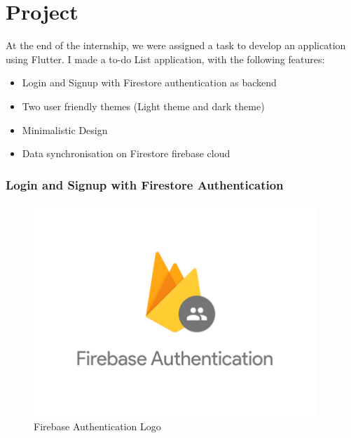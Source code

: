 \chapter{Project}
At the end of the internship, we were assigned a task to develop an application using Flutter. I made a to-do List application, with the following features:\\
\begin{itemize}
\item Login and Signup with Firestore authentication as backend
\item Two user friendly themes (Light theme and dark theme)
\item Minimalistic Design
\item Data synchronisation on Firestore firebase cloud
\end{itemize}
\hfill
\newpage

\subsection{Login and Signup with Firestore Authentication}

\begin{figure}
  \begin{center}
  \includegraphics[height=80mm]{Images & Logos/CH_08_FirebaseAuth.png}
  \end{center}
  \caption{Firebase Authentication Logo}
\end{figure}

